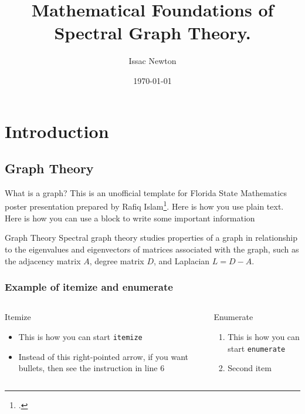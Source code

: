 \documentclass{ctexbeamer}
\title[A short version of the title goes here]{Mathematical Foundations of Spectral Graph Theory.}
\author[Newton]{Issac Newton}
\institute{Nanjing University}
\date{\today}
\begin{document}
\maketitle

\section{Introduction}
\subsection{Graph Theory}
\begin{frame}{What is a graph?}
    This is an unofficial template for Florida State Mathematics poster presentation prepared by Rafiq 
    Islam\footcite{fsumathposter25}. Here is how you use plain text. Here is how you can use a block to write some important information \cite{fsubeamerpresent25}
    \begin{block}{Graph Theory}
        Spectral graph theory studies properties of a graph in relationship to the eigenvalues and eigenvectors of matrices associated with the graph, such as the adjacency matrix $A$, degree matrix $D$, and Laplacian $L = D - A$.
    \end{block}
\end{frame}
\begin{frame}
    \frametitle{Example of itemize and enumerate}
    \begin{columns}[t,totalwidth=\textwidth]
        \begin{column}{0.5\textwidth}
            \begin{block}{Itemize}
                \begin{itemize}
                    \item This is how you can start \texttt{itemize}
                    \item Instead of this right-pointed arrow, if you want bullets, then see the instruction in line 6
                \end{itemize}
            \end{block}
        \end{column}
        \begin{column}{0.5\textwidth}
            \begin{block}{Enumerate}
                \begin{enumerate}
                    \item This is how you can start \texttt{enumerate}
                    \item Second item
                \end{enumerate}
            \end{block}
        \end{column}
    \end{columns}
\end{frame}
\end{document}
